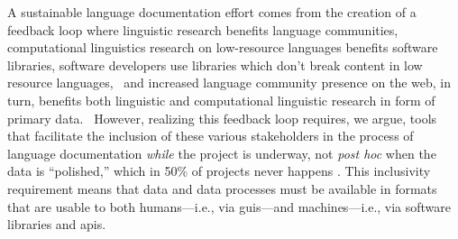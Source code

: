 \documentclass[11pt]{article}
\newcommand{\smalltodo}[2][]
    {\todo[caption={#2}, #1]
    {\tiny#2\normalsize}}
\begin{document}
A sustainable language documentation effort comes from the creation of a
feedback loop where linguistic research benefits language communities,
computational linguistics research on low-resource languages benefits software
libraries, software developers use libraries which don't break content in
low resource languages,%
~and increased language community presence on the web, in turn, benefits both
linguistic and computational linguistic research in form of primary data.%
~However, realizing this feedback loop requires, we argue, tools that facilitate
the inclusion of these various stakeholders in the process of language documentation
\emph{while} the project is underway, not \emph{post hoc} when the data is ``polished,''
which in 50\% of projects never happens \cite{Thieberger:2012}. This
inclusivity requirement means that data and data processes must be available in
formats that are usable to both humans---i.e., via \glspl{gui}---and machines---i.e.,
via software libraries and \glspl{api}.
\end{document}
